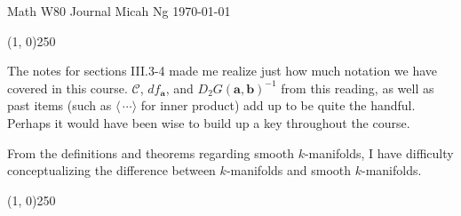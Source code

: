 \documentclass[11pt,letterpaper]{article}
\begin{document}
\noindent
Math W80 Journal \hfill Micah Ng \hfill \today

\begin{center}
\line(1, 0){250}
\end{center}

The notes for sections III.3-4 made me realize just how much notation we have
covered in this course. $\mathscr{C}$, $df_\mathbf{a}$, and
$D_2G(\mathbf{a},\mathbf{b})^{-1}$ from this reading, as well as past items
(such as $\langle\,\cdots\rangle$ for inner product) add up to be quite the
handful. Perhaps it would have been wise to build up a key throughout the
course.

From the definitions and theorems regarding smooth $k$-manifolds, I have
difficulty conceptualizing the difference between $k$-manifolds and smooth
$k$-manifolds.

\begin{center}
\line(1, 0){250}
\end{center}
\end{document}

